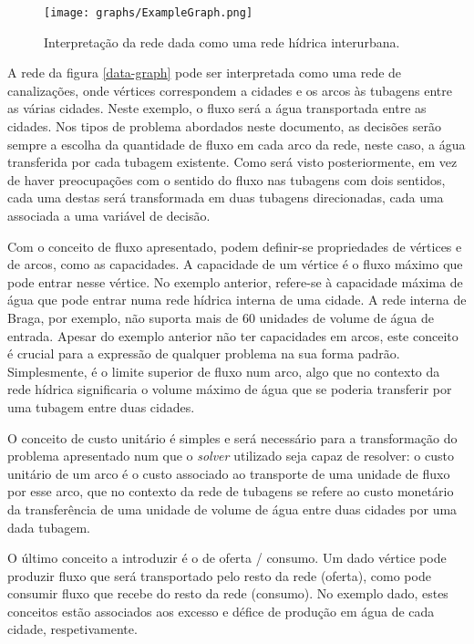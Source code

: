\documentclass[12pt, a4paper, titlepage]{article}
\begin{document}
\begin{figure}[H]
    \centering
    \texttt{[image: graphs/ExampleGraph.png]}
    \caption{Interpretação da rede dada como uma rede hídrica interurbana.}
    \label{example-graph}
\end{figure}

A rede da figura \ref{data-graph} pode ser interpretada como uma rede de canalizações, onde vértices
correspondem a cidades e os arcos às tubagens entre as várias cidades. Neste exemplo, o fluxo será a
água transportada entre as cidades. Nos tipos de problema abordados neste documento, as decisões
serão sempre a escolha da quantidade de fluxo em cada arco da rede, neste caso, a água transferida
por cada tubagem existente. Como será visto posteriormente, em vez de haver preocupações com o
sentido do fluxo nas tubagens com dois sentidos, cada uma destas será transformada em duas tubagens
direcionadas, cada uma associada a uma variável de decisão.

Com o conceito de fluxo apresentado, podem definir-se propriedades de vértices e de arcos, como as
capacidades. A capacidade de um vértice é o fluxo máximo que pode entrar nesse vértice. No exemplo
anterior, refere-se à capacidade máxima de água que pode entrar numa rede hídrica interna de uma
cidade. A rede interna de Braga, por exemplo, não suporta mais de 60 unidades de volume de água de
entrada. Apesar do exemplo anterior não ter capacidades em arcos, este conceito é crucial para a
expressão de qualquer problema na sua forma padrão. Simplesmente, é o limite superior de fluxo num
arco, algo que no contexto da rede hídrica significaria o volume máximo de água que se poderia
transferir por uma tubagem entre duas cidades.

O conceito de custo unitário é simples e será necessário para a transformação do problema
apresentado num que o \emph{solver} utilizado seja capaz de resolver: o custo unitário de um arco é
o custo associado ao transporte de uma unidade de fluxo por esse arco, que no contexto da rede de
tubagens se refere ao custo monetário da transferência de uma unidade de volume de água entre duas
cidades por uma dada tubagem.

O último conceito a introduzir é o de oferta / consumo. Um dado vértice pode produzir fluxo que será
transportado pelo resto da rede (oferta), como pode consumir fluxo que recebe do resto da rede
(consumo). No exemplo dado, estes conceitos estão associados aos excesso e défice de produção em
água de cada cidade, respetivamente.
\end{document}
